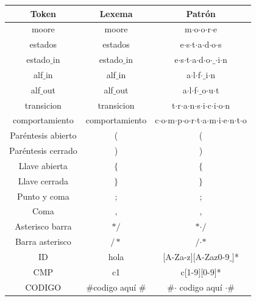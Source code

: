 	\begin{center}
	\begin{tabular}{|c|c|c|}
		\hline 
		\textbf{Token} & \textbf{Lexema} & \textbf{Patrón} \\ 
		\hline 
		moore & moore & m$\cdot$o$\cdot$o$\cdot$r$\cdot$e  \\ 
		\hline 
		estados &estados & e$\cdot$s$\cdot$t$\cdot$a$\cdot$d$\cdot$o$\cdot$s \\ 
		\hline 
		estado$\_$in & estado$\_$in & e$\cdot$s$\cdot$t$\cdot$a$\cdot$d$\cdot$o$\cdot$$\_$$\cdot$i$\cdot$n \\ 
		\hline 
		alf$\_$in	& alf$\_$in & a$\cdot$l$\cdot$f$\cdot$$\_$i$\cdot$n \\ 
		\hline 
		alf$\_$out	& alf$\_$out & a$\cdot$l$\cdot$f$\cdot$$\_$o$\cdot$u$\cdot$t \\ 
		\hline 
		transicion	& transicion & t$\cdot$r$\cdot$a$\cdot$n$\cdot$s$\cdot$i$\cdot$c$\cdot$i$\cdot$o$\cdot$n \\ 
		\hline 
		comportamiento	& comportamiento & c$\cdot$o$\cdot$m$\cdot$p$\cdot$o$\cdot$r$\cdot$t$\cdot$a$\cdot$m$\cdot$i$\cdot$e$\cdot$n$\cdot$t$\cdot$o \\ 
		\hline 
		Paréntesis abierto	& ( & ( \\ 
		\hline 
		Paréntesis cerrado	& ) & ) \\ 
		\hline 
		Llave abierta	& $\{$ & $\{$ \\ 
		\hline 
		Llave cerrada	& $\}$ & $\}$ \\ 
		\hline 
		Punto y coma	& ; & ; \\ 
		\hline 
		Coma	& , &  , \\ 
		\hline
		Asterisco barra & $\ast/$  & $\ast$$\cdot/$ \\ 
		\hline 
		Barra asterisco & $/\ast$  &  $/$$\cdot$$\ast$ \\ 
		\hline  
		ID	& hola  & [A-Za-z][A-Zaz0-9$\_$]* \\ 
		\hline 
		CMP	& c1 & c[1-9][0-9]* \\ 
		\hline
		CODIGO	& $\#$codigo aquí $\#$  & $\#$$\cdot$ codigo aquí $\cdot$$\#$\\ 
		\hline
		
		
		
	\end{tabular} 	
\end{center}






